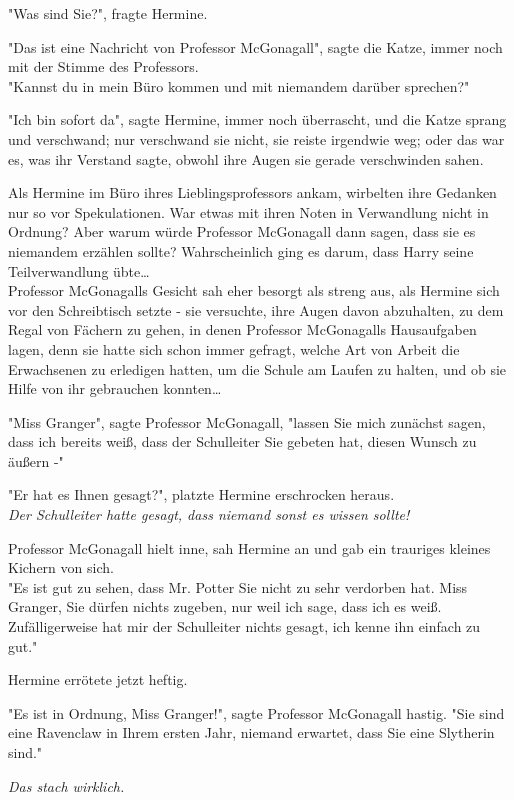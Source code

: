 {"Was sind Sie?", fragte Hermine.

"Das ist eine Nachricht von Professor McGonagall", sagte die Katze, immer noch mit der Stimme des Professors.\\ "Kannst du in mein Büro kommen und mit niemandem darüber sprechen?"

"Ich bin sofort da", sagte Hermine, immer noch überrascht, und die Katze sprang und verschwand; nur verschwand sie nicht, sie reiste irgendwie weg; oder das war es, was ihr Verstand sagte, obwohl ihre Augen sie gerade verschwinden sahen.

Als Hermine im Büro ihres Lieblingsprofessors ankam, wirbelten ihre Gedanken nur so vor Spekulationen. War etwas mit ihren Noten in Verwandlung nicht in Ordnung? Aber warum würde Professor McGonagall dann sagen, dass sie es niemandem erzählen sollte? Wahrscheinlich ging es darum, dass Harry seine Teilverwandlung übte…\\ Professor McGonagalls Gesicht sah eher besorgt als streng aus, als Hermine sich vor den Schreibtisch setzte - sie versuchte, ihre Augen davon abzuhalten, zu dem Regal von Fächern zu gehen, in denen Professor McGonagalls Hausaufgaben lagen, denn sie hatte sich schon immer gefragt, welche Art von Arbeit die Erwachsenen zu erledigen hatten, um die Schule am Laufen zu halten, und ob sie Hilfe von ihr gebrauchen konnten…

"Miss Granger", sagte Professor McGonagall, "lassen Sie mich zunächst sagen, dass ich bereits weiß, dass der Schulleiter Sie gebeten hat, diesen Wunsch zu äußern -"

"Er hat es Ihnen gesagt?", platzte Hermine erschrocken heraus.\\ \emph{Der Schulleiter hatte gesagt, dass niemand sonst es wissen sollte!}

Professor McGonagall hielt inne, sah Hermine an und gab ein trauriges kleines Kichern von sich.\\ "Es ist gut zu sehen, dass Mr. Potter Sie nicht zu sehr verdorben hat. Miss Granger, Sie dürfen nichts zugeben, nur weil ich sage, dass ich es weiß. Zufälligerweise hat mir der Schulleiter nichts gesagt, ich kenne ihn einfach zu gut."

Hermine errötete jetzt heftig.

"Es ist in Ordnung, Miss Granger!", sagte Professor McGonagall hastig. "Sie sind eine Ravenclaw in Ihrem ersten Jahr, niemand erwartet, dass Sie eine Slytherin sind."

\emph{Das stach wirklich.}

}
